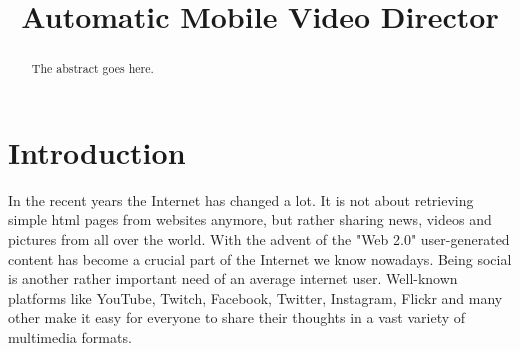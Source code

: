 \documentclass[conference]{IEEEtran}
\begin{document}
\title{Automatic Mobile Video Director}

\author{
\and
\and
\and
}


\maketitle

\begin{abstract}
The abstract goes here.
\end{abstract}

\section{Introduction}

In the recent years the Internet has changed a lot. 
It is not about retrieving simple html pages from websites anymore, 
but rather sharing news, videos and pictures from all over the world.
With the advent of the "Web 2.0" user-generated content has become a crucial part of the Internet we know nowadays.
Being social is another rather important need of an average internet user.
Well-known platforms like YouTube, Twitch, Facebook, Twitter, Instagram, Flickr and many other
make it easy for everyone to share their thoughts in a vast variety of multimedia formats.
\end{document}

